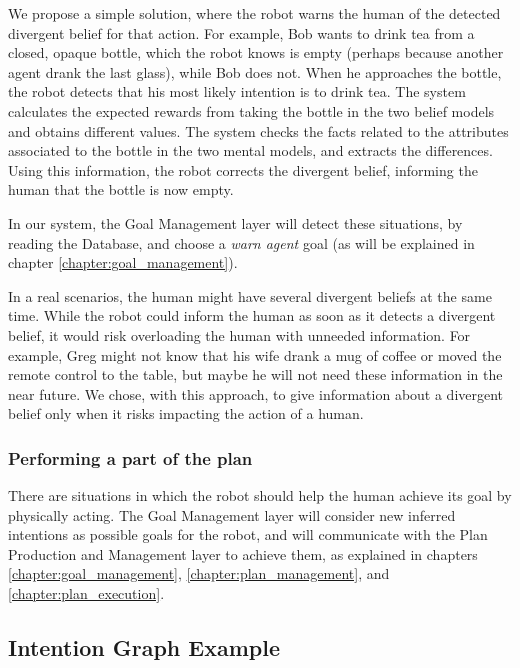 We propose a simple solution, where the robot warns the human of the detected divergent belief for that action. For example, Bob wants to drink tea from a closed, opaque bottle, which the robot knows is empty (perhaps because another agent drank the last glass), while Bob does not. When he approaches the bottle, the robot detects that his most likely intention is to drink tea. The system calculates the expected rewards from taking the bottle in the two belief models and obtains different values. The system checks the facts related to the attributes associated to the bottle in the two mental models, and extracts the differences. Using this information, the robot corrects the divergent belief, informing the human that the bottle is now empty. 

In our system, the Goal Management layer will detect these situations, by reading the Database, and choose a \textit{warn agent} goal (as will be explained in chapter \ref{chapter:goal_management}).

In a real scenarios, the human might have several divergent beliefs at the same time. While the robot could inform the human as soon as it detects a divergent belief, it would risk overloading the human with unneeded information. For example, Greg might not know that his wife drank a mug of coffee or moved the remote control to the table, but maybe he will not need these information in the near future. We chose, with this approach, to give information about a divergent belief only when it risks impacting the action of a human.

\subsubsection{Performing a part of the plan}
There are situations in which the robot should help the human achieve its goal by physically acting. The Goal Management layer will consider new inferred intentions as possible goals for the robot, and will communicate with the Plan Production and Management layer to achieve them, as explained in chapters \ref{chapter:goal_management}, \ref{chapter:plan_management}, and \ref{chapter:plan_execution}. 


\subsection{Intention Graph Example}

